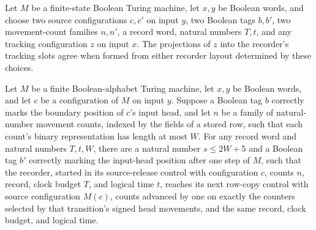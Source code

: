 \begin{lemma}
\label{Complexity.clRec_track_inactive}
\leanok
{}
Let $M$ be a finite-state Boolean Turing machine, let $x,y$ be Boolean words, and choose
two source configurations $c,c'$ on input $y$, two Boolean tags $b,b'$, two
movement-count families $n,n'$, a record word, natural numbers $T,t$, and any tracking
configuration $z$ on input $x$. The projections of $z$ into the recorder's tracking
slots agree when formed from either recorder layout determined by these choices.
\end{lemma}

\begin{lemma}
\label{Complexity.clRec_advance}
\leanok
{}
Let $M$ be a finite Boolean-alphabet Turing machine, let $x,y$ be Boolean words, and let
$c$ be a configuration of $M$ on input $y$. Suppose a Boolean tag $b$ correctly marks
the boundary position of $c$'s input head, and let $n$ be a family of natural-number
movement counts, indexed by the fields of a stored row, such that each count's binary
representation has length at most $W$. For any record word and natural numbers $T,t,W$,
there are a natural number $s \le 2W+5$ and a Boolean tag $b'$ correctly marking the
input-head position after one step of $M$, such that the recorder, started in its
source-release control with configuration $c$, counts $n$, record, clock budget $T$, and
logical time $t$, reaches its next row-copy control with source configuration $M(c)$,
counts advanced by one on exactly the counters selected by that transition's signed head
movements, and the same record, clock budget, and logical time.
\end{lemma}

